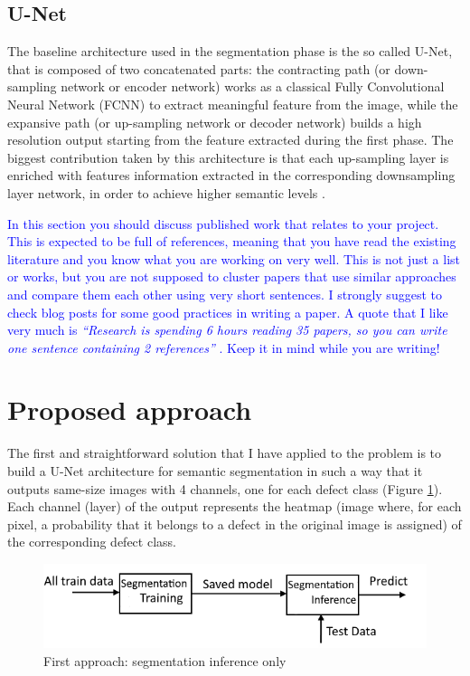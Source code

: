 \documentclass[10pt,twocolumn,letterpaper]{article}
\begin{document}
   \subsection{U-Net}
      The baseline architecture used in the segmentation phase is the so called U-Net, that is composed of two concatenated parts: the contracting path (or down-sampling network or encoder network) works as a classical Fully Convolutional Neural Network (FCNN) to extract meaningful feature from the image, while the expansive path (or up-sampling network or decoder network) builds a high resolution output starting from the feature extracted during the first phase. The biggest contribution taken by this architecture is that each up-sampling layer is enriched with features information extracted in the corresponding downsampling layer network, in order to achieve higher semantic levels \cite{Unet}. 
   

\textcolor{blue}{
In this section you should discuss published work that relates to your project. This is expected to be full of references, meaning that you have read the existing literature and you know what you are working on very well. This is not just a list or works, but you are not supposed to cluster papers that use similar approaches and compare them each other using very short sentences. I strongly suggest to check \cite{steinhardt, lipton} blog posts for some good practices in writing a paper. A quote that I like very much is \emph{``Research is spending 6 hours reading 35 papers, so you can write one sentence containing 2 references''} \cite{twit:ref}. Keep it in mind while you are writing!
}



\section{Proposed approach}
   The first and straightforward solution that I have applied to the problem is to build a U-Net architecture for semantic segmentation in such a way that it outputs same-size images with 4 channels, one for each defect class (Figure \ref{fig:firstApproach}).  
   Each channel (layer) of the output represents the heatmap (image where, for each pixel, a probability that it belongs to a defect in the original image is assigned) of the corresponding defect class. 

   \begin{figure}[h]
      \centering
      \caption{First approach: segmentation inference only} \label{fig:firstApproach}
      \includegraphics[scale=0.55]{Img_FirstApproach}
   \end{figure}
\end{document}
